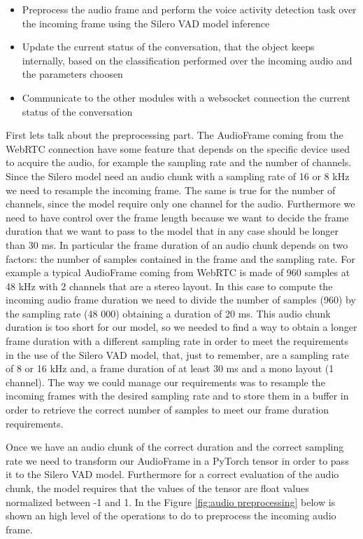 \documentclass[../main.tex]{subfiles}
\begin{document}
\begin{itemize}
    \item Preprocess the audio frame and perform the voice activity detection task over the incoming frame using the Silero VAD model inference
    \item Update the current status of the conversation, that the object keeps internally, based on the classification performed over the incoming audio and the parameters choosen 
    \item Communicate to the other modules with a websocket connection the current status of the conversation
\end{itemize}

First lets talk about the preprocessing part. The AudioFrame coming from the WebRTC connection have some feature that depends on the specific device used to acquire the audio, for example the sampling rate and the number of channels. Since the Silero model need an audio chunk with a sampling rate of 16 or 8 kHz we need to resample the incoming frame. The same is true for the number of channels, since the model require only one channel for the audio. Furthermore we need to have control over the frame length because we want to decide the frame duration that we want to pass to the model that in any case should be longer than 30 ms. In particular the frame duration of an audio chunk depends on two factors: the number of samples contained in the frame and the sampling rate. For example a typical AudioFrame coming from WebRTC is made of 960 samples at 48 kHz with 2 channels that are a stereo layout. In this case to compute the incoming audio frame duration we need to divide the number of samples (960) by the sampling rate (48 000) obtaining a duration of 20 ms. This audio chunk duration is too short for our model, so we needed to find a way to obtain a longer frame duration with a different sampling rate in order to meet the requirements in the use of the Silero VAD model, that, just to remember, are a sampling rate of 8 or 16 kHz and, a frame duration of at least 30 ms and a mono layout (1 channel). The way we could manage our requirements was to resample the incoming frames with the desired sampling rate and to store them in a buffer in order to retrieve the correct number of samples to meet our frame duration requirements.

Once we have an audio chunk of the correct duration and the correct sampling rate we need to transform our AudioFrame in a PyTorch tensor in order to pass it to the Silero VAD model. Furthermore for a correct evaluation of the audio chunk, the model requires that the values of the tensor are float values normalized between -1 and 1. In the Figure \ref{fig:audio preprocessing} below is shown an high level of the operations to do to preprocess the incoming audio frame.
\end{document}
